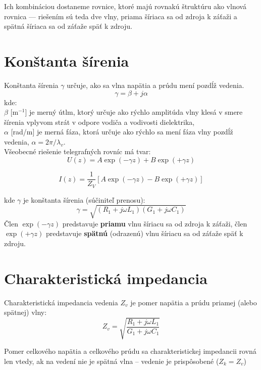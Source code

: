 Ich kombináciou dostaneme rovnice, ktoré majú rovnakú štruktúru ako vlnová rovnica — riešením sú teda dve vlny, priama šíriaca sa od zdroja k záťaži a spätná šíriaca sa od záťaže späť k zdroju.
\section{Konštanta šírenia}

Konštanta šírenia $\gamma$ určuje, ako sa vlna napätia a prúdu mení pozdĺž vedenia. 
\begin{equation}
	\gamma = \beta + j\alpha
\end{equation}
kde:\\ $\beta$ [m$^{-1}$] je merný útlm, ktorý určuje ako rýchlo amplitúda vlny klesá v smere šírenia vplyvom strát v odpore vodiča a vodivosti dielektrika, \\$\alpha$ [rad/m] je merná fáza, ktorá určuje ako rýchlo sa mení fáza vlny pozdĺž vedenia, $\alpha = 2\pi / \lambda_v$.\\
\bigskip
Všeobecné riešenie telegrafných rovníc má tvar:
\begin{equation}
	U(z) = A \exp (- \gamma z) + B \exp(+ \gamma z)
\end{equation}

\begin{equation}
	I(z) = \frac{1}{Z_V} [A \exp (- \gamma z) - B \exp(+ \gamma z)]
\end{equation}

kde $\gamma$ je konštanta šírenia (súčiniteľ prenosu):
\begin{equation}
	\gamma = \sqrt{(R_1 + j\omega L_1)(G_1 + j \omega C_1)}
\end{equation}
Člen $\exp (-\gamma z) $ predstavuje \textbf{priamu} vlnu šíriacu sa od zdroja k záťaži, člen $\exp (+\gamma z) $ predstavuje \textbf{spätnú} (odrazenú) vlnu šíriacu sa od záťaže späť k zdroju.

\section{Charakteristická impedancia}
Charakteristická impedancia vedenia $Z_v$ je pomer napätia a prúdu priamej (alebo spätnej) vlny:
\begin{equation}
	Z_v = \sqrt{\frac{R_1 + j \omega L_1}{G_1 + j \omega C_1}}
\end{equation}

Pomer celkového napätia a celkového prúdu sa charakteristickej impedancii rovná len vtedy, ak na vedení nie je spätná vlna -- vedenie je prispôsobené ($Z_k = Z_v$)

